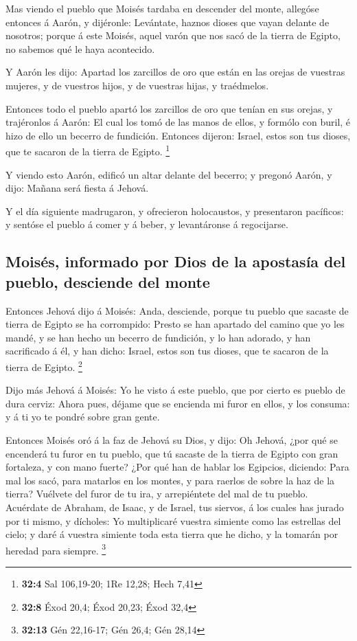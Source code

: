  Mas viendo el pueblo que Moisés tardaba en descender del
monte, allegóse entonces á Aarón, y dijéronle: Levántate, haznos dioses
que vayan delante de nosotros; porque á este Moisés, aquel varón que nos
sacó de la tierra de Egipto, no sabemos qué le haya acontecido.

 Y Aarón les dijo: Apartad los zarcillos de oro que están en
las orejas de vuestras mujeres, y de vuestros hijos, y de vuestras
hijas, y traédmelos.

 Entonces todo el pueblo apartó los zarcillos de oro que
tenían en sus orejas, y trajéronlos á Aarón:  El cual los
tomó de las manos de ellos, y formólo con buril, é hizo de ello un
becerro de fundición. Entonces dijeron: Israel, estos son tus dioses,
que te sacaron de la tierra de Egipto. \footnote{\textbf{32:4} Sal
  106,19-20; 1Re 12,28; Hech 7,41}

 Y viendo esto Aarón, edificó un altar delante del becerro;
y pregonó Aarón, y dijo: Mañana será fiesta á Jehová.

 Y el día siguiente madrugaron, y ofrecieron holocaustos, y
presentaron pacíficos: y sentóse el pueblo á comer y á beber, y
levantáronse á regocijarse.

\hypertarget{moisuxe9s-informado-por-dios-de-la-apostasuxeda-del-pueblo-desciende-del-monte}{%
\subsection{Moisés, informado por Dios de la apostasía del pueblo,
desciende del
monte}\label{moisuxe9s-informado-por-dios-de-la-apostasuxeda-del-pueblo-desciende-del-monte}}

 Entonces Jehová dijo á Moisés: Anda, desciende, porque tu
pueblo que sacaste de tierra de Egipto se ha corrompido: 
Presto se han apartado del camino que yo les mandé, y se han hecho un
becerro de fundición, y lo han adorado, y han sacrificado á él, y han
dicho: Israel, estos son tus dioses, que te sacaron de la tierra de
Egipto. \footnote{\textbf{32:8} Éxod 20,4; Éxod 20,23; Éxod 32,4}

 Dijo más Jehová á Moisés: Yo he visto á este pueblo, que
por cierto es pueblo de dura cerviz:  Ahora pues, déjame
que se encienda mi furor en ellos, y los consuma: y á ti yo te pondré
sobre gran gente.

 Entonces Moisés oró á la faz de Jehová su Dios, y dijo: Oh
Jehová, ¿por qué se encenderá tu furor en tu pueblo, que tú sacaste de
la tierra de Egipto con gran fortaleza, y con mano fuerte? 
¿Por qué han de hablar los Egipcios, diciendo: Para mal los sacó, para
matarlos en los montes, y para raerlos de sobre la haz de la tierra?
Vuélvete del furor de tu ira, y arrepiéntete del mal de tu pueblo.
 Acuérdate de Abraham, de Isaac, y de Israel, tus siervos,
á los cuales has jurado por ti mismo, y dícholes: Yo multiplicaré
vuestra simiente como las estrellas del cielo; y daré á vuestra simiente
toda esta tierra que he dicho, y la tomarán por heredad para siempre.
\footnote{\textbf{32:13} Gén 22,16-17; Gén 26,4; Gén 28,14}

